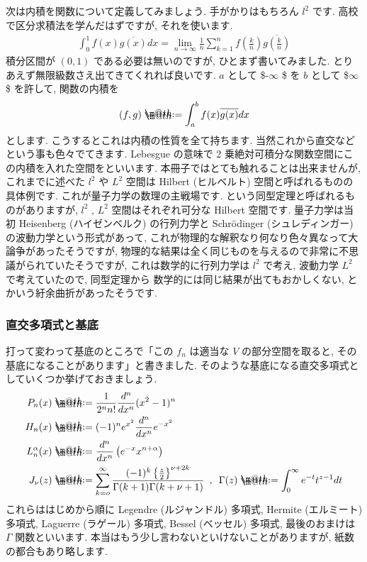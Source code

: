 \documentclass[openany, a4paper, oneside]{jsbook}
\makeatletter
\newcommand*{\defeq}{\mathrel{\rlap{%
\raisebox{0.3ex}{$\m@th\cdot$}}%
\raisebox{-0.3ex}{$\m@th\cdot$}}%
=}
\theoremstyle{break}
\theoremstyle{breakdefn}
\makeatother
\begin{document}
次は内積を関数について定義してみましょう. 手がかりはもちろん $l^2$ です.
高校で区分求積法を学んだはずですが, それを使います.
\begin{align}
\int _{0}^1 f (x)\overline{g (x)}dx
=
\lim_{n \to \infty }\frac{1}{n}\sum_{k=1}^{n}f\left ( \frac{k}{n}\right) \overline{g\left ( \frac{k}{n}\right)}
\end{align}
積分区間が $(0,1)$ である必要は無いのですが, ひとまず書いてみました.
とりあえず無限級数さえ出てきてくれれば良いです.  $a$ として \$-$\infty$ \$ を $b$ として \$$\infty$ \$ を許して,
関数の内積を
\begin{align}
(f,g) \defeq \int_a^b f (x)\overline{g (x)}dx
\end{align}
とします. こうするとこれは内積の性質を全て持ちます.
当然これから直交などという事も色々でてきます.
Lebesgue の意味で 2 乗絶対可積分な関数空間にこの内積を入れた空間をといいます.
本冊子ではとても触れることは出来ませんが, これまでに述べた $l^2$ や $L^2$ 空間は
Hilbert (ヒルベルト) 空間と呼ばれるものの具体例です.
これが量子力学の数理の主戦場です.
という同型定理と呼ばれるものがありますが,
 $l^2$ ,  $L^2$ 空間はそれぞれ可分な Hilbert 空間です.
量子力学は当初 Heisenberg (ハイゼンベルク) の行列力学と Schr\"odinger (シュレディンガー) の波動力学という形式があって,
これが物理的な解釈なり何なり色々異なって大論争があったそうですが,
物理的な結果は全く同じものを与えるので非常に不思議がられていたそうですが,
これは数学的に行列力学は $l^2$ で考え, 波動力学 $L^2$ で考えていたので, 同型定理から
数学的には同じ結果が出てもおかしくない, とかいう紆余曲折があったそうです.
\subsubsection{直交多項式と基底}


打って変わって基底のところで「この $f_n$ は適当な $V$ の部分空間を取ると, その基底になることがあります」と書きました.
そのような基底になる直交多項式としていくつか挙げておきましょう.
\begin{align}
P_n (x) &\defeq \frac{1}{2^n n!}\frac{d^n}{dx^n}(x^2-1)^n \\
H_n (x) &\defeq (-1)^n e^{x^2} \frac{d^n}{dx^n}e^{-x^2} \\
L_n^{\alpha}(x) &\defeq \frac{d^n}{dx^n}\left ( e^{-x} x^{n + \alpha} \right) \\
J_{\nu }(z) &\defeq \sum_{k=o}^{\infty} \frac{(-1)^k \left \{ \frac{z}{2} \right \}^{\nu + 2k}}
{\Gamma (k + 1) \Gamma (k + \nu +1)}
\,\,\, , \,\,\, \Gamma (z) \defeq \int_0^{\infty}e^{-t}t^{z-1}dt
\end{align}
これらははじめから順に Legendre (ルジャンドル) 多項式, Hermite (エルミート) 多項式,
Laguerre (ラゲール) 多項式, Bessel (ベッセル) 多項式, 最後のおまけは $\Gamma$ 関数といいます.
本当はもう少し言わないといけないことがありますが, 紙数の都合もあり略します.
\end{document}
